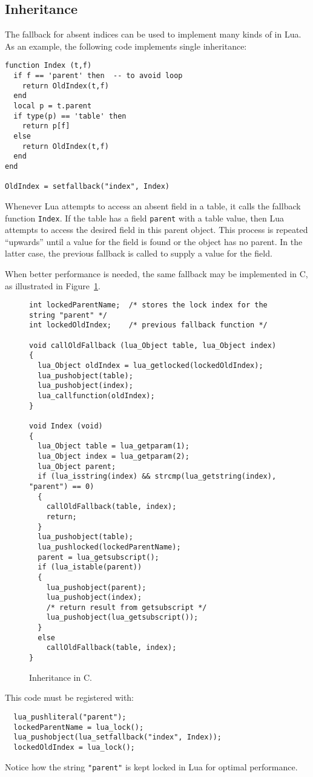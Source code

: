 \subsection{Inheritance} \label{exfallback}
The fallback for absent indices can be used to implement many
kinds of  in Lua.
As an example,
the following code implements single inheritance:
\begin{verbatim}
function Index (t,f)
  if f == 'parent' then  -- to avoid loop
    return OldIndex(t,f)
  end
  local p = t.parent
  if type(p) == 'table' then
    return p[f]
  else
    return OldIndex(t,f)
  end
end

OldIndex = setfallback("index", Index)
\end{verbatim}
Whenever Lua attempts to access an absent field in a table,
it calls the fallback function \verb'Index'.
If the table has a field \verb'parent' with a table value,
then Lua attempts to access the desired field in this parent object.
This process is repeated ``upwards'' until a value
for the field is found or the object has no parent.
In the latter case, the previous fallback is called to supply a value
for the field.

When better performance is needed,
the same fallback may be implemented in C,
as illustrated in Figure~\ref{Cinher}.
\begin{figure}
\Line
\begin{verbatim}
int lockedParentName;  /* stores the lock index for the string "parent" */
int lockedOldIndex;    /* previous fallback function */

void callOldFallback (lua_Object table, lua_Object index)
{
  lua_Object oldIndex = lua_getlocked(lockedOldIndex);
  lua_pushobject(table);
  lua_pushobject(index);
  lua_callfunction(oldIndex);
}

void Index (void)
{
  lua_Object table = lua_getparam(1);
  lua_Object index = lua_getparam(2);
  lua_Object parent;
  if (lua_isstring(index) && strcmp(lua_getstring(index), "parent") == 0)
  {
    callOldFallback(table, index);
    return;
  }
  lua_pushobject(table);
  lua_pushlocked(lockedParentName);
  parent = lua_getsubscript();
  if (lua_istable(parent))
  {
    lua_pushobject(parent);
    lua_pushobject(index);
    /* return result from getsubscript */
    lua_pushobject(lua_getsubscript());
  }
  else
    callOldFallback(table, index);
}
\end{verbatim}
\caption{Inheritance in C.\label{Cinher}}
\Line
\end{figure}
This code must be registered with:
\begin{verbatim}
  lua_pushliteral("parent");
  lockedParentName = lua_lock();
  lua_pushobject(lua_setfallback("index", Index));
  lockedOldIndex = lua_lock();
\end{verbatim}
Notice how the string \verb'"parent"' is kept
locked in Lua for optimal performance.


